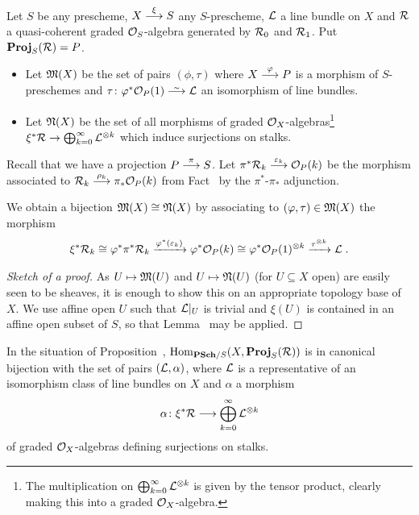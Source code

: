 \documentclass[a4paper,parskip=half,numbers=enddot, DIV=12]{scrreprt}
\begin{document}
Let $S$ be any prescheme, $X\morphism[\xi]S$ any $S$-prescheme, $\mathcal{L}$ a line bundle on $X$ and $\mathcal{R}$ a quasi-coherent graded $\mathcal{O}_S$-algebra generated by $\mathcal{R}_0$ and $\mathcal{R}_1$. Put $\operatorname{\mathbf{Proj}}_S(\mathcal{R})=P$.
\begin{itemize}
	\item Let $\mathfrak{M}(X)$ be the set of pairs $(\phi,\tau)$ where $X\morphism[\phi]P$ is a morphism of $S$-preschemes and $\tau\colon \phi^*\Oo_{P}(1)\isomorphism \Ll$ an isomorphism of line bundles.	
	\item Let $\mathfrak{N}(X)$ be the set of all morphisms of graded $\mathcal{O}_X$-algebras\footnote{The multiplication on $\bigoplus_{k=0}^\infty\mathcal{L}^{\otimes k}$ is given by the tensor product, clearly making this into a graded $\mathcal{O}_X$-algebra.} $\xi^*\Rr\morphism\bigoplus_{k=0}^\infty\Ll^{\otimes k}$ which induce surjections on stalks.
\end{itemize}
Recall that we have a projection $P\morphism[\pi]S$. Let $\pi^*\Rr_k\morphism[\epsilon_k]\Oo_{P}(k)$ be the morphism associated to $\Rr_k\morphism[\rho_k]\pi_*\Oo_{P}(k)$ from Fact~ by the $\pi^*$-$\pi_*$ adjunction. 
\begin{prop}	
	We obtain a bijection $\mathfrak{M}(X)\cong \mathfrak{N}(X)$ by associating to $(\varphi,\tau)\in\mathfrak{M}(X)$ the morphism 
	\begin{align*}
		\xi^*\mathcal{R}_k\cong \varphi^*\pi^*\mathcal{R}_k\xrightarrow{\varphi^*(\varepsilon_k)}\varphi^*\mathcal{O}_{P}(k)\cong \varphi^*\mathcal{O}_{P}(1)^{\otimes k}\xrightarrow{\tau^{\otimes k}}\mathcal{L}\;.
	\end{align*}
\end{prop}
\begin{proof}[Sketch of a proof]
	As $U\mapsto\mathfrak{M}(U)$ and $U\mapsto\mathfrak{N}(U)$ (for $U\subseteq X$ open) are easily seen to be sheaves, it is enough to show this on an appropriate topology base of $X$. We use affine open $U$ such that $\mathcal{L}|_U$ is trivial and $\xi(U)$ is contained in an affine open subset of $S$, so that Lemma~ may be applied.
\end{proof}
\begin{cor}
	In the situation of Proposition~, $\Hom_{\cat{PSch}/S}(X,\PROJ_S(\Rr))$ is in canonical bijection with the set of pairs $(\mathcal{L},\alpha)$, where $\mathcal{L}$ is a representative of an isomorphism class of line bundles on $X$ and $\alpha$ a morphism
	\begin{align}\lbl{eq:WhatIsAlpha}
		\alpha\colon\xi^*\Rr\morphism\bigoplus_{k=0}^\infty\Ll^{\otimes k}
	\end{align}
	of graded $\mathcal{O}_X$-algebras defining surjections on stalks.
\end{cor}
\end{document}
